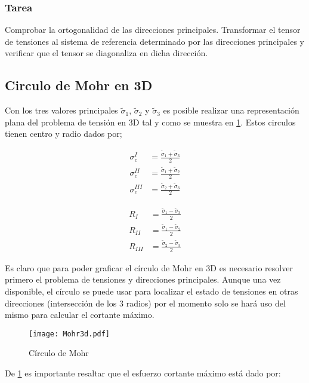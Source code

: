 \documentclass[../notas medios.tex]{subfiles}
\begin{document}
\subsubsection{Tarea}
Comprobar la ortogonalidad de las direcciones principales.
Transformar el tensor de tensiones al sistema de referencia determinado por las direcciones principales y verificar que el tensor se diagonaliza en dicha dirección. 

\subsection{Circulo de Mohr en 3D}

Con los tres valores principales ${{\tilde \sigma }_1}$, ${{\tilde \sigma }_2}$ y  ${{\tilde \sigma }_3}$ es posible realizar una representación plana del problema de tensión en 3D tal y como se muestra en \cref{Mohr3D}. Estos circulos tienen centro y radio dados por;

\begin{align*}
\sigma _c^I & = \frac{{{{\tilde \sigma }_1} + {{\tilde \sigma }_3}}}{2} \\
\sigma _c^{II} & = \frac{{{{\tilde \sigma }_1} + {{\tilde \sigma }_2}}}{2} \\
\sigma _c^{III} & = \frac{{{{\tilde \sigma }_2} + {{\tilde \sigma }_3}}}{2}
\end{align*}

\begin{align*}
{R_I}& = \frac{{{{\tilde \sigma }_1} - {{\tilde \sigma }_3}}}{2}\\
{R_{II}}& = \frac{{{{\tilde \sigma }_1} - {{\tilde \sigma }_2}}}{2}\\
{R_{III}}& = \frac{{{{\tilde \sigma }_2} - {{\tilde \sigma }_3}}}{2}
\end{align*}

Es claro que para poder graficar el círculo de Mohr en 3D es necesario resolver primero el problema de tensiones y direcciones principales. Aunque una vez disponible, el círculo se puede usar para localizar el estado de tensiones en otras direcciones (intersección de los 3 radios) por el momento solo se hará uso del mismo para calcular el cortante máximo.


\begin{figure}[H]
\centering
	\texttt{[image: Mohr3d.pdf]}
	\caption{Círculo de Mohr}
	\label{Mohr3D}
\end{figure}

De \cref{Mohr3D} es importante resaltar que el esfuerzo cortante máximo está dado por:
\end{document}

